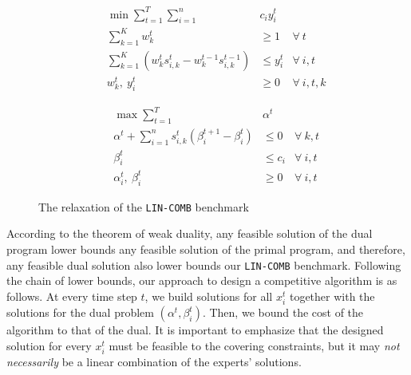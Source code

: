 \begin{figure}
	\begin{mdframed}
		\vspace{-0.2cm}
		\hspace{-0.5cm}
		\begin{minipage}[t]{6.5cm}
			\begin{align*}
					&& \min \sum_{t = 1}^{T} \sum_{i=1}^{n} & c_i y_i^t \\
					&& \sum_{k=1}^{K} w_{k}^{t} & \geq 1  & \forall\ t \\
					&& \sum_{k=1}^{K} \left(w_{k}^{t} s_{i,k}^{t} - w_{k}^{t-1} s_{i,k}^{t-1} \right) &\leq y_i^t  &\forall\ i,t\\
					&& w_{k}^{t},\ y_{i}^{t} & \ge 0 & \forall\ i,t,k
				\end{align*}
		\end{minipage}
		\hspace{0.8cm}
		\begin{minipage}[t]{6cm}
			\begin{align*}
				&& \max \sum_{t=1}^{T} & \alpha^{t} \\
				&& \alpha^{t} + \sum_{i=1}^{n} s_{i,k}^{t} ( \beta_{i}^{t+1} - \beta_{i}^{t})   &\leq 0  &\forall\ k,t\\
				&& \beta_{i}^{t}   &\leq c_{i}  &\forall\ i,t \\
				&& \alpha_{i}^{t},\ \beta_{i}^{t} & \ge 0 & \forall\ i,t
			\end{align*}
		\end{minipage}
	\end{mdframed}
	\caption{The relaxation of the \texttt{LIN-COMB} benchmark}
	\label{fig:relaxation}
\end{figure}

According to the theorem of weak duality, any feasible solution of the dual program lower bounds any feasible solution of the primal program, and therefore, any feasible dual solution also lower bounds our \texttt{LIN-COMB} benchmark. Following the chain of lower bounds, our approach to design a competitive algorithm is as follows. At every time step $t$, we build solutions for all $x_{i}^{t}$ together with the solutions for the dual problem $(\alpha^{t}, \beta_{i}^{t})$. Then, we bound the cost of the algorithm to that of the dual. It is important to emphasize that the designed solution for every $x_{i}^{t}$ must be feasible to the covering constraints, but it may \emph{not necessarily} be a linear combination of the experts' solutions.

